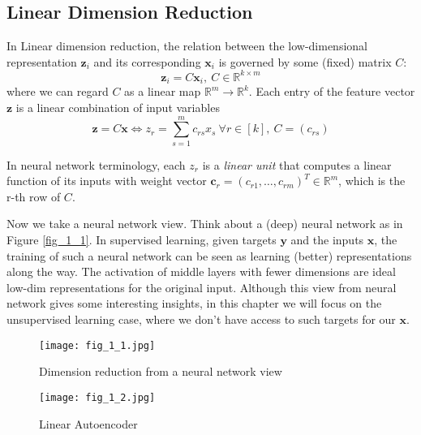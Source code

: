 \documentclass[../main.tex]{subfiles}
\begin{document}
\subsection{Linear Dimension Reduction}
In Linear dimension reduction, the relation between the low-dimensional representation $\bm{z}_i$ and its corresponding $\bm{x}_i$ is governed by some (fixed) matrix $C$:
\begin{equation*}
\bm{z}_i = C\bm{x}_i,\ C\in\mathbb{R}^{k\times m}
\end{equation*}
where we can regard $C$ as a linear map $\mathbb{R}^m\rightarrow \mathbb{R}^k$. Each entry of the feature vector $\bm{z}$ is a linear combination of input variables
\begin{equation*}
\bm{z} = C\bm{x} \Longleftrightarrow z_r = \sum_{s=1}^{m} c_{rs}x_s\ \forall r\in [k],\ C=(c_{rs})
\end{equation*}
\par In neural network terminology, each $z_r$ is a \emph{linear unit} that computes a linear function of its inputs with weight vector $\bm{c}_r = (c_{r1},\dots,c_{rm})^T\in \mathbb{R}^m$, which is the r-th row of $C$.
\par Now we take a neural network view. Think about a (deep) neural network as in Figure \ref{fig_1_1}. In supervised learning, given targets $\bm{y}$ and the inputs $\bm{x}$, the training of such a neural network can be seen as learning (better) representations along the way. The activation of middle layers with fewer dimensions are ideal low-dim representations for the original input. Although this view from neural network gives some interesting insights, in this chapter we will focus on the unsupervised learning case, where we don't have access to such targets for our $\bm{x}$.
\begin{figure}[h]
	\centering
	\begin{minipage}[t]{0.5\linewidth}
		\centering
		\texttt{[image: fig\_1\_1.jpg]}
		\caption{Dimension reduction from a neural network view}\label{fig_1_1}
	\end{minipage}
	\begin{minipage}[t]{0.4\linewidth}       
		\centering
		\texttt{[image: fig\_1\_2.jpg]}
		\caption{Linear Autoencoder}\label{fig_1_2}
	\end{minipage}
\end{figure}
\end{document}
